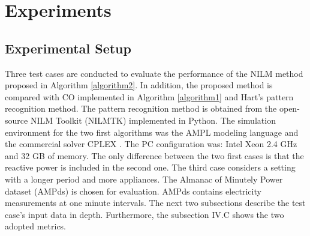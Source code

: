 \chapter{Experiments}

\section{Experimental Setup}

Three test cases are conducted to evaluate the performance of the NILM method proposed in Algorithm \ref{algorithm2}. In addition, the proposed method is compared with CO implemented in Algorithm \ref{algorithm1} and Hart's pattern recognition method. The pattern recognition method is obtained from the open-source NILM Toolkit (NILMTK) \cite{batra2014} implemented in Python. The simulation environment for the two first algorithms was the AMPL modeling language \cite{ampl} and the commercial solver CPLEX \cite{cplex}. The PC configuration was: Intel Xeon 2.4 GHz and 32 GB of memory. The only difference between the two first cases is that the reactive power is included in the second one. The third case considers a setting with a longer period and more appliances. The Almanac of Minutely Power dataset (AMPds) \cite{ampds} is chosen for evaluation. AMPds contains electricity measurements at one minute intervals. The next two subsections describe the test case's input data in depth. Furthermore, the subsection IV.C shows the two adopted metrics.

